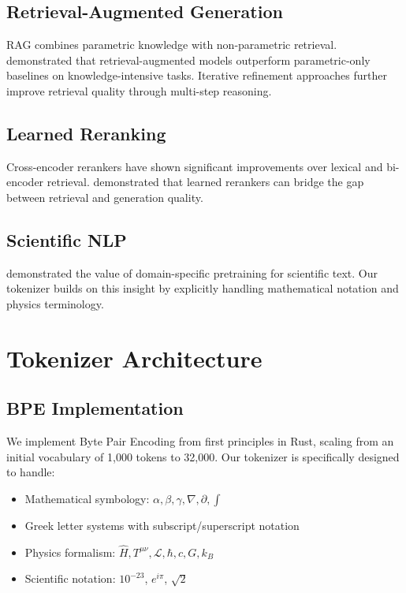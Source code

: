 \documentclass[11pt,a4paper]{article}
\theoremstyle{plain}
\theoremstyle{definition}
\begin{document}
\subsection{Retrieval-Augmented Generation}

RAG \citep{lewis2020rag} combines parametric knowledge with
non-parametric retrieval. \citet{guu2020realm} demonstrated that
retrieval-augmented models outperform parametric-only baselines on
knowledge-intensive tasks. Iterative refinement approaches
\citep{shi2023replug,trivedi2023interleaving} further improve
retrieval quality through multi-step reasoning.

\subsection{Learned Reranking}

Cross-encoder rerankers \citep{nogueira2019passage} have shown
significant improvements over lexical and bi-encoder retrieval.
\citet{gao2021rethink} demonstrated that learned rerankers can
bridge the gap between retrieval and generation quality.

\subsection{Scientific NLP}

\citet{beltagy2019scibert} demonstrated the value of domain-specific
pretraining for scientific text. Our tokenizer builds on this
insight by explicitly handling mathematical notation and physics
terminology.

\section{Tokenizer Architecture}

\subsection{BPE Implementation}

We implement Byte Pair Encoding from first principles in Rust,
scaling from an initial vocabulary of 1,000 tokens to 32,000. Our
tokenizer is specifically designed to handle:

\begin{itemize}[leftmargin=*,itemsep=2pt]
    \item Mathematical symbology: $\alpha, \beta, \gamma, \nabla, \partial, \int$
    \item Greek letter systems with subscript/superscript notation
    \item Physics formalism: $\hat{H}, T^{\mu\nu}, \mathcal{L}, \hbar, c, G, k_B$
    \item Scientific notation: $10^{-23}$, $e^{i\pi}$, $\sqrt{2}$
\end{itemize}
\end{document}
